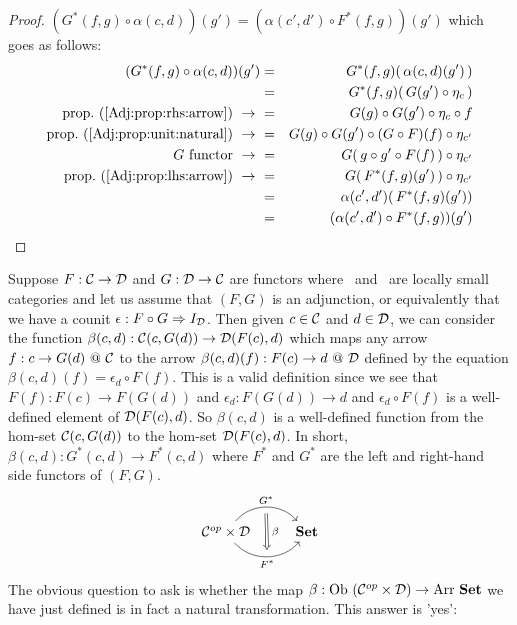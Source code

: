 \begin{proof}
    $(G^{*}(f,g)\circ\alpha(c,d))(g')=(\alpha(c',d')\circ F^{*}(f,g))(g')$
    which goes as follows:
        \begin{eqnarray*}(G^{*}(f,g)\circ\alpha(c,d))(g')
            &=&G^{*}(f,g)(\,\alpha(c,d)(g')\,)\\
            &=&G^{*}(f,g)(\,G(g')\circ\eta_{c}\,)\\
            \mbox{prop.~(\ref{Adj:prop:rhs:arrow})}\ \to\ 
            &=&G(g)\circ G(g')\circ\eta_{c}\circ f\\
            \mbox{prop.~(\ref{Adj:prop:unit:natural})}\ \to\ 
            &=&G(g)\circ G(g')\circ (G\circ F)(f)\circ\eta_{c'}\\
            \mbox{$G$ functor}\ \to\ 
            &=&G(\,g\circ g'\circ F(f)\,)\circ\eta_{c'}\\
            \mbox{prop.~(\ref{Adj:prop:lhs:arrow})}\ \to\ 
            &=&G(\,F^{*}(f,g)(g')\,)\circ\eta_{c'}\\
            &=&\alpha(c',d')(\,F^{*}(f,g)(g'))\\
            &=&(\alpha(c',d')\circ F^{*}(f,g))(g')\\
        \end{eqnarray*}
\end{proof}

Suppose $F:\mbox{$\cal C$}\to\mbox{$\cal D$}$ and $G:\mbox{$\cal D$}\to\mbox{$\cal C$}$ are functors where \Cat\ and \Dat\ 
are locally small categories and let us assume that $(F,G)$ is an adjunction, 
or equivalently that we have a counit $\epsilon:F\circ G\Rightarrow I_{\cal D}$. 
Then given $c\in\mbox{$\cal C$}$ and $d\in\mbox{$\cal D$}$, we can consider the function
$\beta(c,d):\mbox{$\cal C$}(c,G(d))\to\mbox{$\cal D$}(F(c),d)$ which maps any arrow $f:c\to G(d)\ @\ 
\Cat$ to the arrow $\beta(c,d)(f):F(c)\to d\ @\ \mbox{$\cal D$}$ defined by the equation
$\beta(c,d)(f)=\epsilon_{d}\circ F(f)$. This is a valid definition since we see 
that
$F(f):F(c)\to F(G(d))$ and $\epsilon_{d}:F(G(d))\to d$ and $\epsilon_{d}\circ 
F(f)$ is a well-defined element of $\mbox{$\cal D$}(F(c),d)$. So $\beta(c,d)$ is a 
well-defined function from the hom-set $\mbox{$\cal C$}(c,G(d))$ to the hom-set 
$\mbox{$\cal D$}(F(c),d)$. In short, $\beta(c,d):G^{*}(c,d)\to F^{*}(c,d)$ 
where $F^{*}$ and $G^{*}$
are the left and right-hand side functors of $(F,G)$. 
    \[
        \begin{tikzcd}
            \Cop\times\Dat \arrow[r, "G^{*}", bend left  = 50, ""{name=U, below}]
                 \arrow[r, swap, "F^{*}", bend right = 50, ""{name=D, above}]
              & \Set
            \arrow[Rightarrow, "\,\beta", from = U, to = D]
        \end{tikzcd}
    \]
The obvious question to ask is whether the map $\beta:\mbox{\rm Ob}\ (\mbox{${\cal C}^{op}$}\times\mbox{$\cal D$})
\to\mbox{\rm Arr}\ \mbox{\bf Set}$ we have just defined is in fact a natural transformation.
This answer is 'yes':

